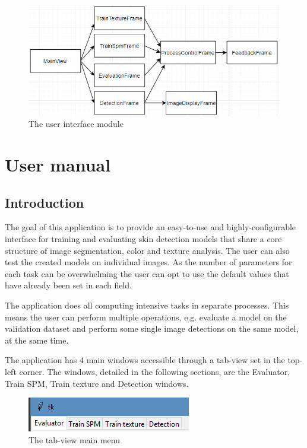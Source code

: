 \documentclass[12pt]{report}
\begin{document}
	\begin{figure}[h!]
		\centering
		\includegraphics[]{design/gui.png}
		\caption{The user interface module}
		\label{fig:gui}
	\end{figure}

	\section{User manual}
	\subsection{Introduction}
	The goal of this application is to provide an easy-to-use and highly-configurable interface for training and evaluating skin detection models that share a core structure of image segmentation, color and texture analysis. The user can also test the created models on individual images. As the number of parameters for each task can be overwhelming the user can opt to use the default values that have already been set in each field.
	
	The application does all computing intensive tasks in separate processes. This means the user can perform multiple operations, e.g. evaluate a model on the validation dataset and perform some single image detections on the same model, at the same time.
	
	The application has 4 main windows accessible through a tab-view set in the top-left corner. The windows, detailed in the following sections, are the Evaluator, Train SPM, Train texture and Detection windows.
	
	\begin{figure}[h]
		\centering
		\includegraphics{manual/tab_view.png}
		\caption{The tab-view main menu}
	\end{figure}
	
\end{document}
